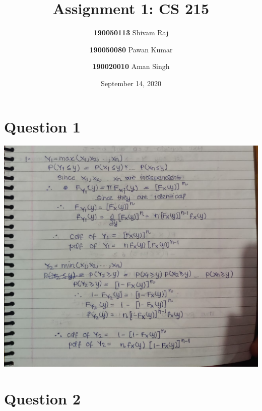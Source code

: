 \documentclass{article}
\title{Assignment 1: CS 215}
\author{
  \textbf{190050113} Shivam Raj
  \and
  \textbf{190050080} Pawan Kumar
  \and
  \textbf{190020010} Aman Singh
}
\date{September 14, 2020}
\theoremstyle{remark}
\begin{document}
\maketitle
\tableofcontents

{}

\section{Question 1}
\includegraphics[width=\textwidth, height=\textheight, keepaspectratio]{1.jpeg} \par
\section{Question 2}
\end{document}
